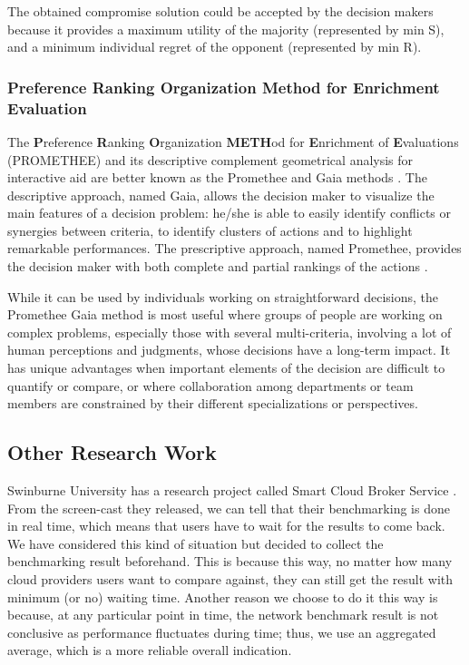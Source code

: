 The obtained compromise solution could be accepted by the decision makers because it provides a maximum utility of the majority (represented by min S), and a minimum individual regret of the opponent (represented by min R).

\subsubsection{Preference Ranking Organization Method for Enrichment Evaluation}
The \textbf{P}reference \textbf{R}anking \textbf{O}rganization \textbf{METH}od for \textbf{E}nrichment of \textbf{E}valuations (PROMETHEE) and its descriptive complement geometrical analysis for interactive aid are better known as the Promethee and Gaia methods \cite{Promethee}.
The descriptive approach, named Gaia, allows the decision maker to visualize the main features of a decision problem: he/she is able to easily identify conflicts or synergies between criteria, to identify clusters of actions and to highlight remarkable performances.
The prescriptive approach, named Promethee, provides the decision maker with both complete and partial rankings of the actions \cite{PROMETHEE_MLwiki}.

While it can be used by individuals working on straightforward decisions, the Promethee Gaia method is most useful where groups of people are working on complex problems, especially those with several multi-criteria, involving a lot of human perceptions and judgments, whose decisions have a long-term impact. It has unique advantages when important elements of the decision are difficult to quantify or compare, or where collaboration among departments or team members are constrained by their different specializations or perspectives.

\subsection{Other Research Work}
Swinburne University has a research project called 
Smart Cloud Broker Service \cite{OpenMarketforTradingCloudServices}.
From the screen-cast they released, we can tell that their
benchmarking is done in real time, which means that users
have to wait for the results to come back. We have considered
this kind of situation but decided to collect the benchmarking
result beforehand. This is because this way, no matter how
many cloud providers users want to compare against, they can
still get the result with minimum (or no) waiting time. Another
reason we choose to do it this way is because, at any particular
point in time, the network benchmark result is not conclusive as
performance fluctuates during time; thus, we use an aggregated
average, which is a more reliable overall indication.

